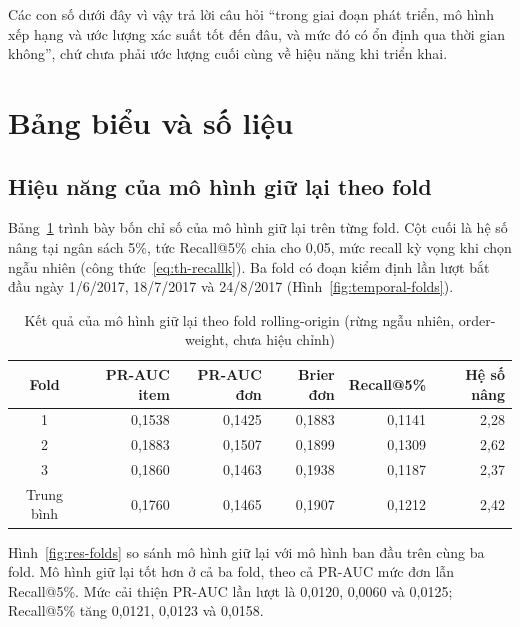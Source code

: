 Các con số dưới đây vì vậy trả lời câu hỏi ``trong giai đoạn phát triển, mô hình xếp hạng và ước lượng xác suất tốt đến đâu, và mức đó có ổn định qua thời gian không'', chứ chưa phải ước lượng cuối cùng về hiệu năng khi triển khai.

\section{Bảng biểu và số liệu}\label{sec:tables}

\subsection{Hiệu năng của mô hình giữ lại theo fold}\label{subsec:tab-folds}

Bảng~\ref{tab:res-folds} trình bày bốn chỉ số của mô hình giữ lại trên từng fold. Cột cuối là hệ số nâng tại ngân sách 5\%, tức Recall@5\% chia cho 0,05, mức recall kỳ vọng khi chọn ngẫu nhiên (công thức~\eqref{eq:th-recallk}). Ba fold có đoạn kiểm định lần lượt bắt đầu ngày 1/6/2017, 18/7/2017 và 24/8/2017 (Hình~\ref{fig:temporal-folds}).

\begin{table}[htbp]\centering\small
\caption{Kết quả của mô hình giữ lại theo fold rolling-origin (rừng ngẫu nhiên, order-weight, chưa hiệu chỉnh)}\label{tab:res-folds}
\begin{tabular}{crrrrr}
\toprule
Fold & PR-AUC item & PR-AUC đơn & Brier đơn & Recall@5\% & Hệ số nâng \\
\midrule
1 & 0,1538 & 0,1425 & 0,1883 & 0,1141 & 2,28 \\
2 & 0,1883 & 0,1507 & 0,1899 & 0,1309 & 2,62 \\
3 & 0,1860 & 0,1463 & 0,1938 & 0,1187 & 2,37 \\
\midrule
Trung bình & 0,1760 & 0,1465 & 0,1907 & 0,1212 & 2,42 \\
\bottomrule
\end{tabular}
\end{table}

Hình~\ref{fig:res-folds} so sánh mô hình giữ lại với mô hình ban đầu trên cùng ba fold. Mô hình giữ lại tốt hơn ở cả ba fold, theo cả PR-AUC mức đơn lẫn Recall@5\%. Mức cải thiện PR-AUC lần lượt là 0,0120, 0,0060 và 0,0125; Recall@5\% tăng 0,0121, 0,0123 và 0,0158.

